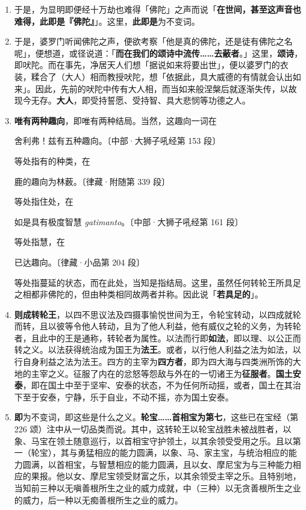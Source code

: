 \begin{enumerate}\item 于是，为显明即便经十万劫也难得「佛陀」之声而说「\textbf{在世间，甚至这声音也难得，此即是『佛陀』}」。这里，\textbf{此即是}为不变词。
\item 于是，婆罗门听闻佛陀之声，便欲考察「他是真的佛陀，还是徒有佛陀之名呢」，便想道，或径说道：「\textbf{而在我们的颂诗中流传……去蔽者}。」这里，\textbf{颂诗}，即吠陀。而在事先，净居天人们想「据说如来将要出世」，便以婆罗门的衣装，糅合了（大人）相而教授吠陀，想「依据此，具大威德的有情就会认出如来」。因此，先前的吠陀中传有大人相，而当如来般涅槃后就逐渐失传，以故现今无存。\textbf{大人}，即受持誓愿、受持智、具大悲悯等功德之人。
\item \textbf{唯有两种趣向}，即唯有两种结局。当然，这趣向一词在\begin{quoting}舍利弗！兹有五种趣向。{\bluefootnotesize 〔中部·大狮子吼经第 153 段〕}\end{quoting}等处指有的种类，在\begin{quoting}鹿的趣向为林薮。{\bluefootnotesize 〔律藏·附随第 339 段〕}\end{quoting}等处指住处，在\begin{quoting}如是具有极度智慧 \textit{gatimanto}。{\bluefootnotesize 〔中部·大狮子吼经第 161 段〕}\end{quoting}等处指慧，在\begin{quoting}已达趣向。{\bluefootnotesize 〔律藏·小品第 204 段〕}\end{quoting}等处指蔓延的状态，而在此处，当知是指结局。这里，虽然任何转轮王所具足之相都非佛陀的，但由种类相同故两者并称。因此说「\textbf{若具足的}」。
\item \textbf{则成转轮王}，以四不思议法及四摄事愉悦世间为王，令轮宝转动，以四成就轮而转，且以彼等令他人转动，且为了他人利益，他有威仪之轮的义务，为转轮者，且此中的王是通称，转轮者为属性。以法而行即\textbf{如法}，即以理、以公正而转之义。以法获得统治成为国王为\textbf{法王}。或者，以行他人利益之法为如法，以行自身利益之法为法王。四方的主宰为\textbf{四方者}，即为四大海与四类洲所饰的大地的主宰之义。征服了内在的忿怒等怨敌与外在的一切诸王为\textbf{征服者}。\textbf{国土安泰}，即在国土中至于坚牢、安泰的状态，不为任何所动摇，或者，国土在其治下至于安泰，宁静，乐于自业，不动不摇，亦为国土安泰。
\item \textbf{即}为不变词，即这些是什么之义。\textbf{轮宝……首相宝为第七}，这些已在宝经（第 226 颂）注中从一切品类而说。其中，这转轮王以轮宝战胜未被战胜者，以象、马宝在领土随意巡行，以首相宝守护领土，以其余领受受用之乐。且以第一（轮宝），其与勇猛相应的能力圆满，以象、马、家主宝，与统治相应的能力圆满，以首相宝，与智慧相应的能力圆满，且以女、摩尼宝为与三种能力相应的果报。他以女、摩尼宝领受财富之乐，以其余领受主宰之乐。且特别地，当知前三种以无嗔善根所生之业的威力成就，中（三种）以无贪善根所生之业的威力，后一种以无痴善根所生之业的威力。

\end{enumerate}
